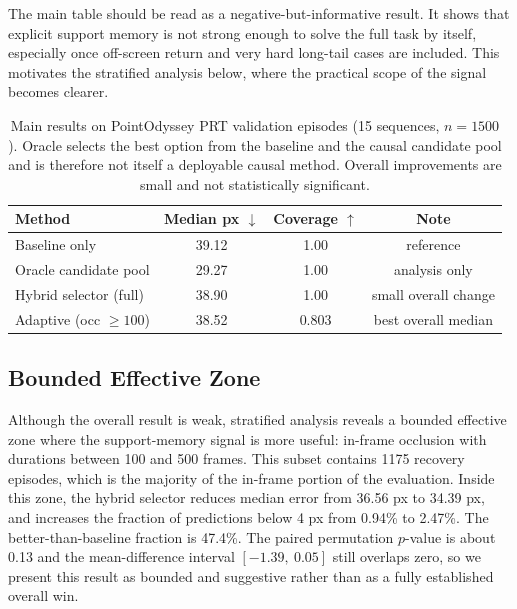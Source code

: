 \documentclass[10pt,journal,compsoc]{IEEEtran}
\begin{document}
The main table should be read as a negative-but-informative result. It shows that explicit support memory is not strong enough to solve the full task by itself, especially once off-screen return and very hard long-tail cases are included. This motivates the stratified analysis below, where the practical scope of the signal becomes clearer.

\begin{table}[t]
    \centering
    \caption{Main results on PointOdyssey PRT validation episodes (15 sequences, $n=1500$). Oracle selects the best option from the baseline and the causal candidate pool and is therefore not itself a deployable causal method. Overall improvements are small and not statistically significant.}
    \label{tab:main_results}
    \setlength{\tabcolsep}{4pt}
    \begin{tabular}{lccc}
        \toprule
        Method & Median px $\downarrow$ & Coverage $\uparrow$ & Note \\
        \midrule
        Baseline only & 39.12 & 1.00 & reference \\
        Oracle candidate pool & 29.27 & 1.00 & analysis only \\
        Hybrid selector (full) & 38.90 & 1.00 & small overall change \\
        Adaptive (occ $\geq 100$) & 38.52 & 0.803 & best overall median \\
        \bottomrule
    \end{tabular}
\end{table}

\subsection{Bounded Effective Zone}

Although the overall result is weak, stratified analysis reveals a bounded effective zone where the support-memory signal is more useful: in-frame occlusion with durations between 100 and 500 frames. This subset contains 1175 recovery episodes, which is the majority of the in-frame portion of the evaluation. Inside this zone, the hybrid selector reduces median error from 36.56 px to 34.39 px, and increases the fraction of predictions below 4 px from 0.94\% to 2.47\%. The better-than-baseline fraction is 47.4\%. The paired permutation $p$-value is about 0.13 and the mean-difference interval $[-1.39,\ 0.05]$ still overlaps zero, so we present this result as bounded and suggestive rather than as a fully established overall win.
\end{document}
